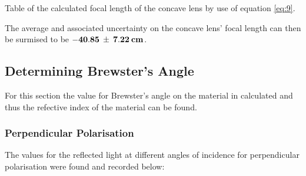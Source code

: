 \documentclass[12pt]{article}
\begin{document}
\begin{table}[H]
    \caption{\centering Table of the calculated focal length of the concave lens by use of equation \ref{eq:9}.}
    \label{tab:5}
\end{table}

The average and associated uncertainty on the concave lens' focal length can then be surmised to be $\mathbf{-40.85 \: \pm \: 7.22 \: \text{\textbf{cm}}}$.

\subsection{Determining Brewster's Angle} \label{sec:3.2}

For this section the value for Brewster's angle on the material in calculated and thus the refective index of the material can be found.

\subsubsection{Perpendicular Polarisation} \label{sec:3.2.1}

The values for the reflected light at different angles of incidence for perpendicular polarisation were found and recorded below:
\end{document}

